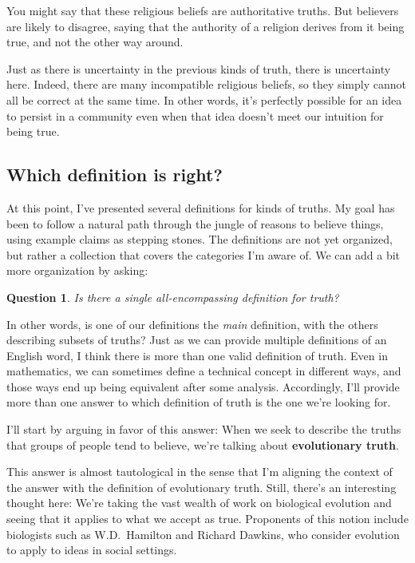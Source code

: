 \documentclass[11pt, oneside]{article}
\newenvironment{answerwnum}[1]
  {\renewcommand\theinnercustomthm{#1}\innercustomthm}
  {\endinnercustomthm}
\newtheorem*{question*}{Question}
\theoremstyle{argtstyle}
\begin{document}
You might say that these religious beliefs are authoritative truths.
But believers are likely to disagree, saying that the authority of a
religion derives from it being true, and not the other way around.

Just as there is uncertainty in the previous kinds of truth, there is
uncertainty here.
Indeed, there are many incompatible religious beliefs, so they simply
cannot all be correct at the same time.
In other words, it's perfectly possible for an idea to persist in a community
even when that idea doesn't meet our intuition for being true.

\subsection{Which definition is right?}

At this point, I've presented several definitions for kinds of
truths. My goal has been to follow a natural path
through the jungle of reasons to believe things, using
example claims as stepping stones.
The definitions are not yet organized, but rather a collection
that covers the categories I'm aware of.
We can add a bit more organization by asking:
\begin{question*}\label{q3}
    Is there a single all-encompassing definition for truth?
\end{question*}
In other words, is one of our definitions the {\em main} definition, with the
others describing subsets of truths?
Just as we can provide multiple definitions of an English word, I think there
is more than one valid definition of truth.
Even in mathematics, we can sometimes
define a technical concept in different ways, and those
ways end up being equivalent after some analysis.
Accordingly, I'll provide more than one answer to
which definition of truth is the one
we're looking for.

I'll start by arguing in favor of this answer:
\begin{answerwnum}{A}
    When we seek to describe the truths that groups of people tend to believe,
    we're talking about \textbf{evolutionary truth}.
\end{answerwnum}

This answer is almost tautological in the sense that I'm aligning the context of
the answer with the definition of evolutionary truth.
Still, there's
an interesting thought here: We're taking the vast wealth of work on
biological evolution and seeing that it applies to what we accept as true.
Proponents of this notion include
biologists such as W.D.~Hamilton and
Richard Dawkins, who consider evolution to apply to ideas in
social settings.
\end{document}
